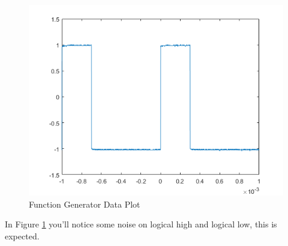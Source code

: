 \documentclass[journal,onecolumn]{IEEEtran}
\begin{document}
\begin{figure}[H]
	\includegraphics{OscilloscopeDataPlot.png}
	\centering
	\caption{Function Generator Data Plot}
	\label{fig:fgdp}
\end{figure}

In Figure \ref{fig:fgdp} you'll notice some noise on logical high and logical low, this is expected.
\end{document}
